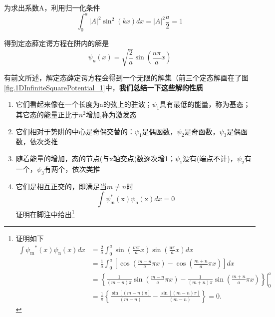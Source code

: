 	为求出系数A，利用归一化条件
	\begin{equation}
	\int_{0}^{a}|A|^{2} \sin ^{2}(k x) d x=|A|^{2} \frac{a}{2}=1
	\end{equation}

	得到定态薛定谔方程在阱内的解是
	\begin{equation}
	\boxed{\psi_{n}(x)=\sqrt{\frac{2}{a}} \sin \left(\frac{n \pi}{a} x\right)}
	\end{equation}

	有前文所述，解定态薛定谔方程会得到一个无限的解集（前三个定态解画在了图\ref{fig.1DInfiniteSquarePotential_1}中，\textbf{我们总结一下这些解的性质}
	\begin{enumerate}
	\item 它们看起来像在一个长度为a的弦上的驻波；$\psi_1$具有最低的能量，称为基态；其它态的能量正比于$n^2$增加,称为激发态
	\item 它们相对于势阱的中心是奇偶交替的：$\psi_1$是偶函数，$\psi_2$是奇函数，$\psi_3$是偶函数，依次类推
	\item 随着能量的增加，态的节点(与x轴交点)数逐次增1；$\psi_1$没有(端点不计)，$\psi_2$有一个，$\psi_3$有两个，依次类推
	\item 它们是相互正交的，即满足当$m \neq n$时
			\begin{equation}
			\int \psi_{\mathrm{m}}^{*}(\mathrm{x}) \psi_{\mathrm{n}}(\mathrm{x}) d x=0
			\end{equation}
		  证明在脚注中给出\footnote{证明如下\begin{equation*}
									\begin{aligned}
									\int \psi_{\mathrm{m}}{ }^{*} (x) \psi_{\mathrm{n}}(x) d x&=\frac{2}{a} \int_{0}^{a} \sin \left(\frac{m \pi}{a} x\right) \sin \left(\frac{\mathrm{n} \pi}{a} x\right) d x \\
									&=\frac{1}{a} \int_{0}^{a}\left[\cos \left(\frac{m-n}{a} \pi x\right)-\cos \left(\frac{m+n}{a} \pi x\right)\right] d x \\
									&=\left.\left\{\frac{1}{(m-n) \pi} \sin \left(\frac{m-n}{a} \pi x\right)-\frac{1}{(m+n) \pi} \sin \left(\frac{m+n}{a} \pi x\right)\right\}\right|_{0} ^{a} \\
									&=\frac{1}{\pi}\left\{\frac{\sin [(m-n) \pi]}{(m-n)}-\frac{\sin [(m-n) \pi]}{(m-n)}\right\}=0 .
									\end{aligned}
									\end{equation*}}


\end{enumerate}
